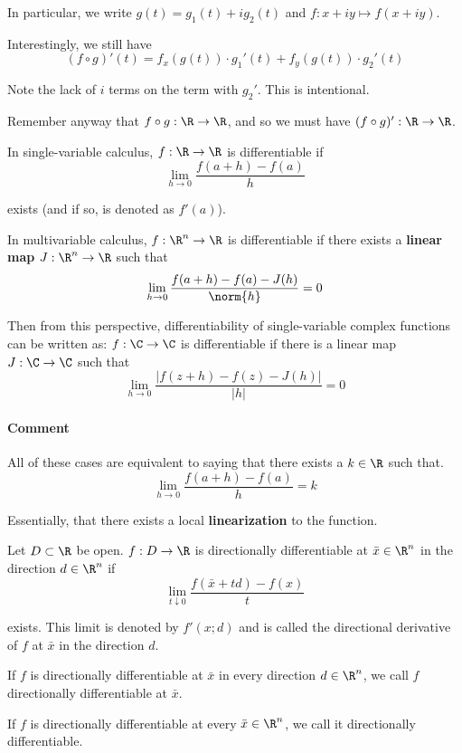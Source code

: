 In particular, we write $g(t)=g_1(t)+ig_2(t)$ and $f:x+iy\mapsto f(x+iy)$.

Interestingly, we still have
$$
  (f\circ g)'(t) =
  f_x(g(t))\cdot {g_1}'(t)+f_y(g(t))\cdot {g_2}'(t)
$$

Note the lack of $i$ terms on the term with ${g_2}'$. This is intentional.

Remember anyway that $f\circ g:\R\to\R$, and so we must have $(f\circ
g)':\R\to\R$.

\label{c62315d}

In single-variable calculus, $f:\R\to\R$ is differentiable if
$$
  \lim_{h\to0}\frac{f(a+h)-f(a)}h
$$

exists (and if so, is denoted as $f'(a)$).

In multivariable calculus, $f:\R^n\to\R$ is differentiable if there exists a
\textbf{linear map} $J:\R^n\to\R$ such that
$$
  \lim_{h\to0}\frac{f(a+h)-f(a)-J(h)}{\norm{h}}=0
$$

Then from this perspective, differentiability of single-variable complex
functions can be written as: $f:\C\to\C$ is differentiable if there is a linear
map $J:\C\to\C$ such that
$$
  \lim_{h\to0}\frac{|f(z+h)-f(z)-J(h)|}{|h|}=0
$$

\paragraph{Comment}

All of these cases are equivalent to saying that there exists a $k\in\R$ such
that.
$$
  \lim_{h\to0}\frac{f(a+h)-f(a)}h=k
$$

Essentially, that there exists a local \textbf{linearization} to the function.

\label{dbbf530}

Let $D\subset \R$ be open. $f:D\to\R$ is directionally differentiable at $\bar
x\in\R^n$ in the direction $d\in\R^n$ if
$$
  \lim_{t\downarrow0}\frac{f(\bar x+td)-f(x)}t
$$

exists. This limit is denoted by $f'(x;d)$ and is called the directional
derivative of $f$ at $\bar x$ in the direction $d$.

If $f$ is directionally differentiable at $\bar x$ in every direction
$d\in\R^n$, we call $f$ directionally differentiable at $\bar x$.

If $f$ is directionally differentiable at every $\bar x\in\R^n$, we call it
directionally differentiable.

